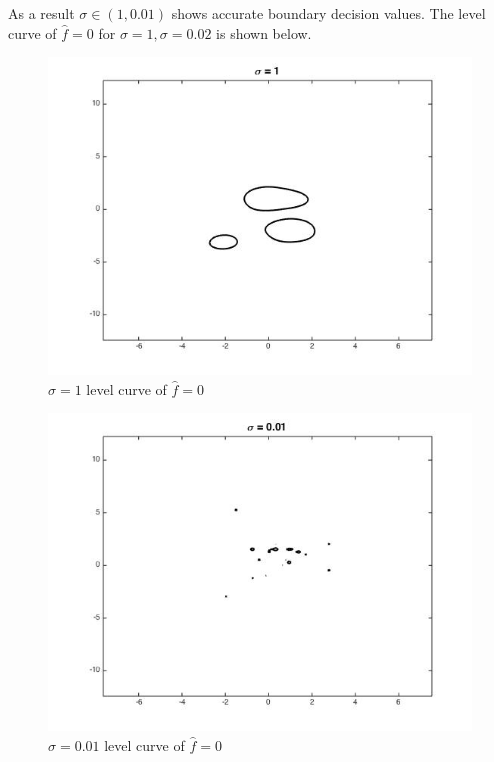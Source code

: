 \documentclass[twoside]{article}
\theoremstyle{definition}
\theoremstyle{definition}
\theoremstyle{remark}
\begin{document}
As a result $\sigma \in (1, 0.01)$ shows accurate boundary decision values. The level curve of $\hat f = 0$ for $\sigma = 1, \sigma = 0.02$ is shown below. 
\begin{figure}[H]
\centering
\includegraphics[width=120mm]{sigma_1_level_curve.jpg}
\caption{ $\sigma = 1$ level curve of $\hat f = 0$ \label{problem2Pic6}}
\end{figure}

\begin{figure}[H]
\centering
\includegraphics[width=120mm]{sigma_001_lc.jpg}
\caption{ $\sigma = 0.01$ level curve of $\hat f = 0$ \label{problem2Pic6}}
\end{figure}
\end{document}
